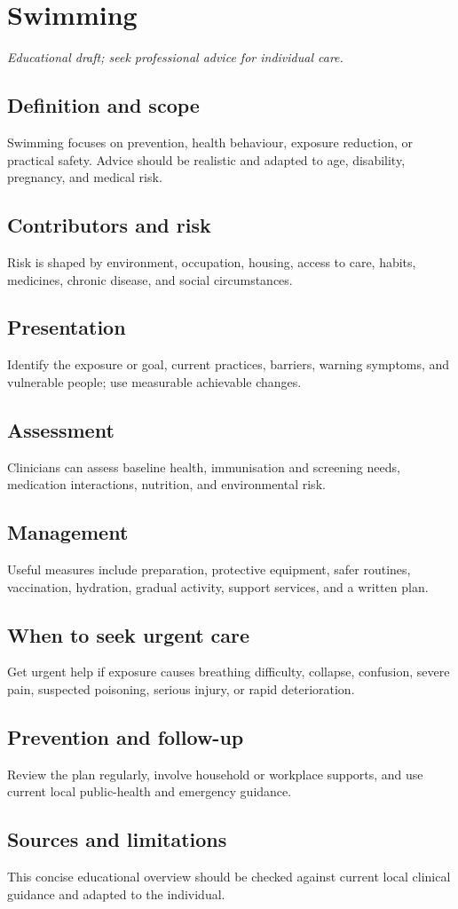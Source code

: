 \chapter{Swimming}
\medskip
\noindent\textit{Educational draft; seek professional advice for individual care.}

\section*{Definition and scope}
Swimming focuses on prevention, health behaviour, exposure reduction, or practical safety. Advice should be realistic and adapted to age, disability, pregnancy, and medical risk.

\section*{Contributors and risk}
Risk is shaped by environment, occupation, housing, access to care, habits, medicines, chronic disease, and social circumstances.

\section*{Presentation}
Identify the exposure or goal, current practices, barriers, warning symptoms, and vulnerable people; use measurable achievable changes.

\section*{Assessment}
Clinicians can assess baseline health, immunisation and screening needs, medication interactions, nutrition, and environmental risk.

\section*{Management}
Useful measures include preparation, protective equipment, safer routines, vaccination, hydration, gradual activity, support services, and a written plan.

\section*{When to seek urgent care}
Get urgent help if exposure causes breathing difficulty, collapse, confusion, severe pain, suspected poisoning, serious injury, or rapid deterioration.

\section*{Prevention and follow-up}
Review the plan regularly, involve household or workplace supports, and use current local public-health and emergency guidance.

\section*{Sources and limitations}
This concise educational overview should be checked against current local clinical guidance and adapted to the individual.
